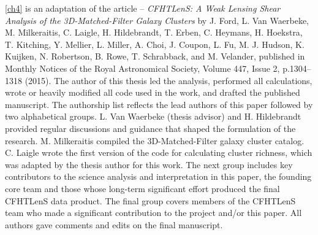\autoref{ch4} is an adaptation of the article -- {\it CFHTLenS: A Weak Lensing Shear Analysis of the 3D-Matched-Filter Galaxy Clusters} by J. Ford, L. Van Waerbeke, M. Milkeraitis, C. Laigle, H. Hildebrandt, T. Erben, C. Heymans, H. Hoekstra, T. Kitching, Y. Mellier, L. Miller, A. Choi, J. Coupon, L. Fu, M. J. Hudson, K. Kuijken, N. Robertson, B. Rowe, T. Schrabback, and M. Velander, published in Monthly Notices of the Royal Astronomical Society, Volume 447, Issue 2, p.1304--1318 (2015). The author of this thesis led the analysis, performed all calculations, wrote or heavily modified all code used in the work, and drafted the published manuscript. The authorship list reflects the lead authors of this paper followed by two alphabetical groups. L. Van Waerbeke (thesis advisor) and H. Hildebrandt provided regular discussions and guidance that shaped the formulation of the research. M. Milkeraitis compiled the 3D-Matched-Filter galaxy cluster catalog. C. Laigle wrote the first version of the code for calculating cluster richness, which was adapted by the thesis author for this work. The next group includes key contributors to the science analysis and interpretation in this paper, the founding core team and those whose long-term significant effort produced the final \acs{CFHTLenS} data product. The final group covers members of the \acs{CFHTLenS} team who made a significant contribution to the project and/or this paper. All authors gave comments and edits on the final manuscript.


